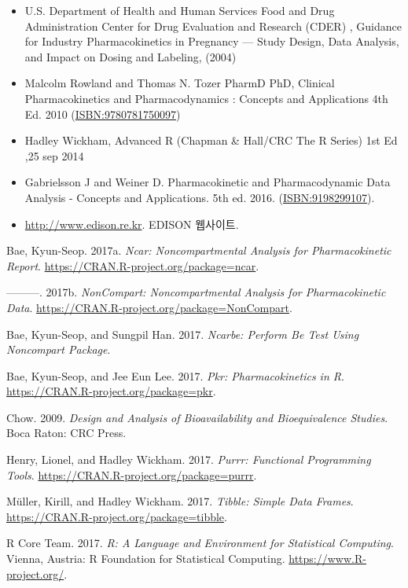 \documentclass[12pt,]{krantz}
\providecommand{\tightlist}{%
  \setlength{\itemsep}{0pt}\setlength{\parskip}{0pt}}
\theoremstyle{definition}
\theoremstyle{definition}
\theoremstyle{definition}
\theoremstyle{remark}
\begin{document}
\begin{itemize}
\tightlist
\item
  U.S. Department of Health and Human Services Food and Drug
  Administration Center for Drug Evaluation and Research (CDER) ,
  Guidance for Industry Pharmacokinetics in Pregnancy --- Study Design,
  Data Analysis, and Impact on Dosing and Labeling, (2004)
\item
  Malcolm Rowland and Thomas N. Tozer PharmD PhD, Clinical
  Pharmacokinetics and Pharmacodynamics : Concepts and Applications 4th
  Ed. 2010 (\url{ISBN:9780781750097})
\item
  Hadley Wickham, Advanced R (Chapman \& Hall/CRC The R Series) 1st Ed
  ,25 sep 2014
\item
  Gabrielsson J and Weiner D. Pharmacokinetic and Pharmacodynamic Data
  Analysis - Concepts and Applications. 5th ed. 2016.
  (\url{ISBN:9198299107}).
\item
  \url{http://www.edison.re.kr}. EDISON 웹사이트.
\end{itemize}

\hypertarget{refs}{}
\hypertarget{ref-R-ncar}{}
Bae, Kyun-Seop. 2017a. \emph{Ncar: Noncompartmental Analysis for
Pharmacokinetic Report}. \url{https://CRAN.R-project.org/package=ncar}.

\hypertarget{ref-R-NonCompart}{}
---------. 2017b. \emph{NonCompart: Noncompartmental Analysis for
Pharmacokinetic Data}.
\url{https://CRAN.R-project.org/package=NonCompart}.

\hypertarget{ref-R-ncarbe}{}
Bae, Kyun-Seop, and Sungpil Han. 2017. \emph{Ncarbe: Perform Be Test
Using Noncompart Package}.

\hypertarget{ref-R-pkr}{}
Bae, Kyun-Seop, and Jee Eun Lee. 2017. \emph{Pkr: Pharmacokinetics in
R}. \url{https://CRAN.R-project.org/package=pkr}.

\hypertarget{ref-chow2009design}{}
Chow. 2009. \emph{Design and Analysis of Bioavailability and
Bioequivalence Studies}. Boca Raton: CRC Press.

\hypertarget{ref-R-purrr}{}
Henry, Lionel, and Hadley Wickham. 2017. \emph{Purrr: Functional
Programming Tools}. \url{https://CRAN.R-project.org/package=purrr}.

\hypertarget{ref-R-tibble}{}
Müller, Kirill, and Hadley Wickham. 2017. \emph{Tibble: Simple Data
Frames}. \url{https://CRAN.R-project.org/package=tibble}.

\hypertarget{ref-R-base}{}
R Core Team. 2017. \emph{R: A Language and Environment for Statistical
Computing}. Vienna, Austria: R Foundation for Statistical Computing.
\url{https://www.R-project.org/}.
\end{document}
